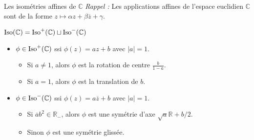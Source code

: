 \documentclass[bigger]{m53beamer}
\begin{document}
\begin{frame}{Les isométries affines de $\mathbb{C}$}
  \textit{Rappel :} Les applications affines de l'espace euclidien $\mathbb{C}$ sont de la forme $z \mapsto \alpha z+\beta\overline{z}+\gamma$.\pause\medskip

  $\operatorname{Iso}(\mathbb{C}) = \operatorname{Iso}^{+}(\mathbb{C}) \sqcup \operatorname{Iso}^{-}(\mathbb{C})$
  \begin{itemize}[<+(1)->]
    \item $\phi \in \operatorname{Iso}^{+}(\mathbb{C})$ ssi $\phi(z)=az+b$ avec $|a|=1$.
      \begin{itemize}[<+(1)->]
        \item Si $a \neq 1$, alors $\phi$ est la rotation de centre $\frac{b}{1-a}$.
        \item Si $a=1$, alors $\phi$ est la translation de $b$.
      \end{itemize}
    \item $\phi \in \operatorname{Iso}^{-}(\mathbb{C})$ ssi $\phi(z)=a\overline{z}+b$ avec $|a|=1$.
      \begin{itemize}[<+(1)->]
        \item Si $\overline{a}b^{2} \in \mathbb{R}_{-}$, alors $\phi$ est une symétrie d'axe $\sqrt{a}\mathbb{R}+b/2$.
        \item Sinon $\phi$ est une symétrie glissée.
      \end{itemize}
  \end{itemize}
\end{frame}
\end{document}
